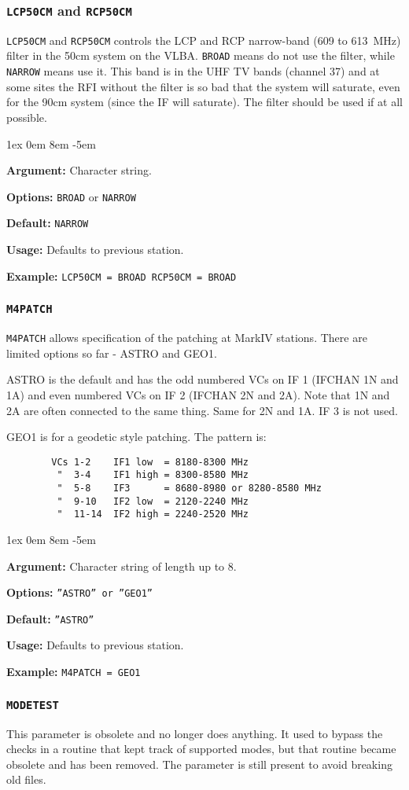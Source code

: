 \documentclass{report}
\newcommand{\rcwbox}[5]{
  \begin{list}{}{\parsep 1ex  \itemsep 0em
                 \leftmargin 8em  \itemindent -5em }
    \item {\bf Argument:} #1
    \item {\bf Options:}  #2
    \item {\bf Default:}  #3
    \item {\bf Usage:}    #4
    \item {\bf Example:}  #5
  \end{list}
}
\begin{document}
\subsubsection{\label{SP:LCP50CM}{\tt LCP50CM} and {\tt RCP50CM}}

{\tt LCP50CM} and {\tt RCP50CM} controls the LCP and RCP narrow-band
(609 to 613~MHz) filter in the 50cm system on the VLBA. {\tt BROAD}
means do not use the filter, while {\tt NARROW} means use it. This
band is in the UHF TV bands (channel 37) and at some sites the RFI
without the filter is so bad that the system will saturate, even for
the 90cm system (since the IF will saturate). The filter should be
used if at all possible.

\rcwbox
{Character string.}
{{\tt BROAD} or {\tt NARROW}}
{{\tt NARROW}}
{Defaults to previous station.}
{{\tt LCP50CM = BROAD  RCP50CM = BROAD}}


\subsubsection{\label{SP:M4PATCH}{\tt M4PATCH}}

{\tt M4PATCH} allows specification of the patching at MarkIV stations.
There are limited options so far - ASTRO and GEO1.

ASTRO is the default and has the odd numbered VCs on IF 1 (IFCHAN 1N
and 1A) and even numbered VCs on IF 2 (IFCHAN 2N and 2A).  Note that
1N and 2A are often connected to the same thing.  Same for 2N and 1A.
IF 3 is not used.

GEO1 is for a geodetic style patching. The pattern is:
\begin{verbatim}
        VCs 1-2    IF1 low  = 8180-8300 MHz
         "  3-4    IF1 high = 8300-8580 MHz
         "  5-8    IF3      = 8680-8980 or 8280-8580 MHz
         "  9-10   IF2 low  = 2120-2240 MHz
         "  11-14  IF2 high = 2240-2520 MHz
\end{verbatim}

\rcwbox
{Character string of length up to 8.}
{{\tt ''ASTRO'' or ''GEO1''}}
{{\tt ''ASTRO''}}
{Defaults to previous station.}
{{\tt M4PATCH = GEO1}}


\subsubsection{\label{SP:MODETEST}{\tt MODETEST}}

This parameter is obsolete and no longer does anything.  It
used to bypass the checks in a routine that kept track of supported
modes, but that routine became obsolete and has been removed.  The
parameter is still present to avoid breaking old files.
\end{document}
